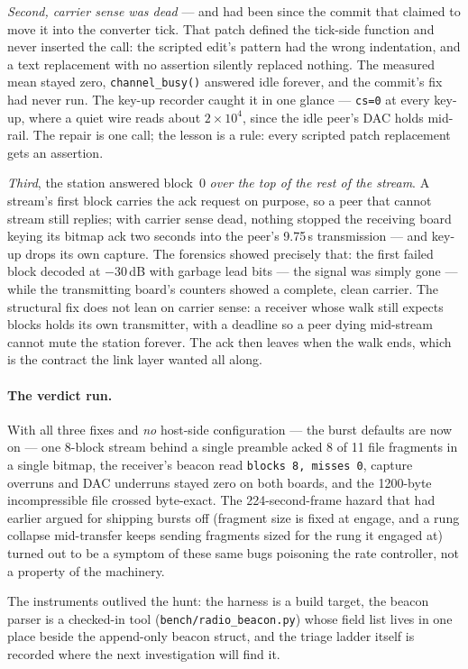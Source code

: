 \emph{Second, carrier sense was dead} --- and had been since the commit
that claimed to move it into the converter tick. That patch defined the
tick-side function and never inserted the call: the scripted edit's
pattern had the wrong indentation, and a text replacement with no
assertion silently replaced nothing. The measured mean stayed zero,
\texttt{channel\_busy()} answered idle forever, and the commit's fix
had never run. The key-up recorder caught it in one glance ---
\texttt{cs=0} at every key-up, where a quiet wire reads about
$2\times10^4$, since the idle peer's DAC holds mid-rail. The repair is
one call; the lesson is a rule: every scripted patch replacement gets
an assertion.

\emph{Third}, the station answered block~0 \emph{over the top of the
rest of the stream}. A stream's first block carries the ack request on
purpose, so a peer that cannot stream still replies; with carrier
sense dead, nothing stopped the receiving board keying its bitmap ack
two seconds into the peer's 9.75\,s transmission --- and key-up drops
its own capture. The forensics showed precisely that: the first failed
block decoded at $-30$\,dB with garbage lead bits --- the signal was
simply gone --- while the transmitting board's counters showed a
complete, clean carrier. The structural fix does not lean on carrier
sense: a receiver whose walk still expects blocks holds its own
transmitter, with a deadline so a peer dying mid-stream cannot mute the
station forever. The ack then leaves when the walk ends, which is the
contract the link layer wanted all along.

\paragraph{The verdict run.} With all three fixes and \emph{no}
host-side configuration --- the burst defaults are now on --- one
8-block stream behind a single preamble acked 8 of 11 file fragments
in a single bitmap, the receiver's beacon read
\texttt{blocks 8, misses 0}, capture overruns and DAC underruns stayed
zero on both boards, and the 1200-byte incompressible file crossed
byte-exact. The 224-second-frame hazard that had earlier argued for
shipping bursts off (fragment size is fixed at engage, and a rung
collapse mid-transfer keeps sending fragments sized for the rung it
engaged at) turned out to be a symptom of these same bugs poisoning
the rate controller, not a property of the machinery.

The instruments outlived the hunt: the harness is a build target, the
beacon parser is a checked-in tool
(\texttt{bench/radio\_beacon.py}) whose field list lives in one place
beside the append-only beacon struct, and the triage ladder itself is
recorded where the next investigation will find it.

